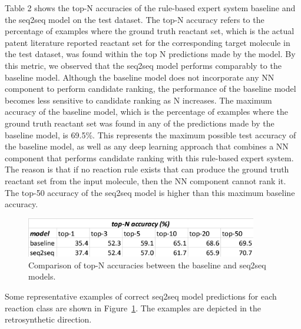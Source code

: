 Table 2 shows the top-N accuracies of the rule-based expert system baseline and the seq2seq model on the test dataset. The top-N accuracy refers to the percentage of examples where the ground truth reactant set, which is the actual patent literature reported reactant set for the corresponding target molecule in the test dataset, was found within the top N predictions made by the model. By this metric, we observed that the seq2seq model performs comparably to the baseline model. Although the baseline model does not incorporate any NN component to perform candidate ranking, the performance of the baseline model becomes less sensitive to candidate ranking as N increases. The maximum accuracy of the baseline model, which is the percentage of examples where the ground truth reactant set was found in any of the predictions made by the baseline model, is 69.5\%. This represents the maximum possible test accuracy of the baseline model, as well as any deep learning approach that combines a NN component that performs candidate ranking with this rule-based expert system. The reason is that if no reaction rule exists that can produce the ground truth reactant set from the input molecule, then the NN component cannot rank it. The top-50 accuracy of the seq2seq model is higher than this maximum baseline accuracy. 


\begin{figure}
  \centering
  \includegraphics[width=0.9\textwidth]{Images/ret_table_2.png}
  \caption{Comparison of top-N accuracies between the baseline and seq2seq models.}
  \label{fig:ret_table2}
\end{figure}

Some representative examples of correct seq2seq model predictions for each reaction class are shown in Figure~\ref{fig:ret_table2}. The examples are depicted in the retrosynthetic direction.

